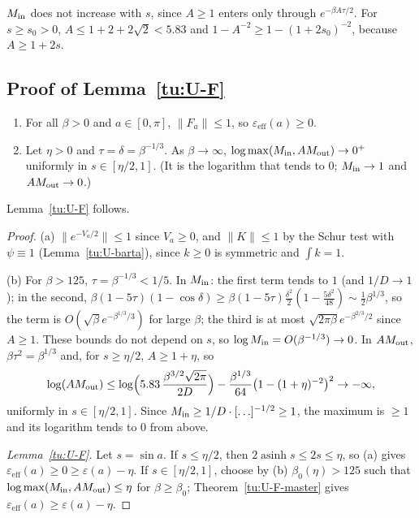 \begin{remark}\label{tu:U-F-unif}
$M_{\rm in}$ does not increase with $s$, since $A\ge1$ enters only through $e^{-\beta A\tau/2}$. For $s\ge s_0>0$,
$A\le1+2+2\sqrt2<5.83$ and $1-A^{-2}\ge1-(1+2s_0)^{-2}$, because $A\ge1+2s$.
\end{remark}

\subsection{Proof of Lemma~\ref{tu:U-F}}

\begin{corollary}\label{tu:U-F-cor}
\begin{enumerate}
\item[(a)] For all $\beta>0$ and $a\in[0,\pi]$, $\|F_a\|\le1$, so $\varepsilon_{\mathrm{eff}}(a)\ge0$.
\item[(b)] Let $\eta>0$ and $\tau=\delta=\beta^{-1/3}$. As $\beta\to\infty$,
$\log\max(M_{\rm in},AM_{\rm out})\to0^+$ uniformly in $s\in[\eta/2,1]$. (It is the logarithm that tends to $0$; $M_{\rm in}\to1$
and $AM_{\rm out}\to0$.)
\end{enumerate}
Lemma~\ref{tu:U-F} follows.
\end{corollary}

\begin{proof}
(a) $\|e^{-V_a/2}\|\le1$ since $V_a\ge0$, and $\|K\|\le1$ by the Schur test with $\psi\equiv1$
(Lemma~\ref{tu:U-barta}), since $k\ge0$ is symmetric and $\int k=1$.

(b) For $\beta>125$, $\tau=\beta^{-1/3}<1/5$. In $M_{\rm in}$: the first term tends to $1$ (and $1/D\to1$); in the
second, $\beta(1-5\tau)(1-\cos\delta)\ge\beta(1-5\tau)\frac{\delta^2}2(1-\frac{5\delta^2}{48})\sim\frac12\beta^{1/3}$, so the term is
$O(\sqrt\beta e^{-\beta^{1/3}/3})$ for large $\beta$; the third is at most $\sqrt{2\pi\beta}e^{-\beta^{2/3}/2}$ since $A\ge1$. These
bounds do not depend on $s$, so $\log M_{\rm in}=O(\beta^{-1/3})\to0$. In $AM_{\rm out}$, $\beta\tau^2=\beta^{1/3}$ and, for
$s\ge\eta/2$, $A\ge1+\eta$, so
\[
\log(AM_{\rm out})\le\log\Bigl(5.83\,\frac{\beta^{3/2}\sqrt{2\pi}}{2D}\Bigr)-\frac{\beta^{1/3}}{64}\bigl(1-(1+\eta)^{-2}\bigr)^2\to-\infty,
\]
uniformly in $s\in[\eta/2,1]$. Since $M_{\rm in}\ge1/D\cdot[\ldots]^{-1/2}\ge1$, the maximum is $\ge1$ and its logarithm tends to
$0$ from above.

\emph{Lemma~\ref{tu:U-F}.} Let $s=\sin a$. If $s\le\eta/2$, then $2\operatorname{asinh}s\le2s\le\eta$, so (a) gives
$\varepsilon_{\mathrm{eff}}(a)\ge0\ge\varepsilon(a)-\eta$. If $s\in[\eta/2,1]$, choose by (b) $\beta_0(\eta)>125$ such that
$\log\max(M_{\rm in},AM_{\rm out})\le\eta$ for $\beta\ge\beta_0$; Theorem~\ref{tu:U-F-master} gives
$\varepsilon_{\mathrm{eff}}(a)\ge\varepsilon(a)-\eta$.
\end{proof}

